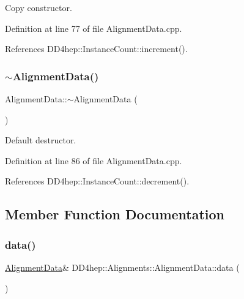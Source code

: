 Copy constructor. 



Definition at line 77 of file Alignment\+Data.\+cpp.



References D\+D4hep\+::\+Instance\+Count\+::increment().

\hypertarget{class_d_d4hep_1_1_alignments_1_1_alignment_data_a1bbd0f76cea046a48fdeee46396b6e5c}{}\label{class_d_d4hep_1_1_alignments_1_1_alignment_data_a1bbd0f76cea046a48fdeee46396b6e5c} 
\subsubsection{\texorpdfstring{$\sim$\+Alignment\+Data()}{~AlignmentData()}}
{\footnotesize\ttfamily Alignment\+Data\+::$\sim$\+Alignment\+Data (\begin{DoxyParamCaption}{ }\end{DoxyParamCaption})\hspace{0.3cm}{\ttfamily [virtual]}}



Default destructor. 



Definition at line 86 of file Alignment\+Data.\+cpp.



References D\+D4hep\+::\+Instance\+Count\+::decrement().



\subsection{Member Function Documentation}
\hypertarget{class_d_d4hep_1_1_alignments_1_1_alignment_data_a9149a3648883a4d6d941e9b1270599b4}{}\label{class_d_d4hep_1_1_alignments_1_1_alignment_data_a9149a3648883a4d6d941e9b1270599b4} 
\subsubsection{\texorpdfstring{data()}{data()}}
{\footnotesize\ttfamily \hyperlink{class_d_d4hep_1_1_alignments_1_1_alignment_data}{Alignment\+Data}\& D\+D4hep\+::\+Alignments\+::\+Alignment\+Data\+::data (\begin{DoxyParamCaption}{ }\end{DoxyParamCaption})\hspace{0.3cm}{\ttfamily [inline]}}



